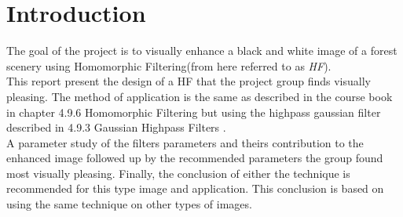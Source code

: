 \section{Introduction}

The goal of the project is to visually enhance a black and white image of a forest scenery using Homomorphic Filtering(from here referred to as \textit{HF}). \\

This report present the design of a HF that the project group finds visually pleasing. 
The method of application is the same as described in the course book in chapter 4.9.6 Homomorphic Filtering but using the highpass gaussian filter described in 4.9.3 Gaussian Highpass Filters \cite{dipBook}. \\

A parameter study of the filters parameters and theirs contribution to the enhanced image followed up by the recommended parameters the group found most visually pleasing. Finally, the conclusion of either the technique is recommended for this type image and application. This conclusion is based on using the same technique on other types of images.